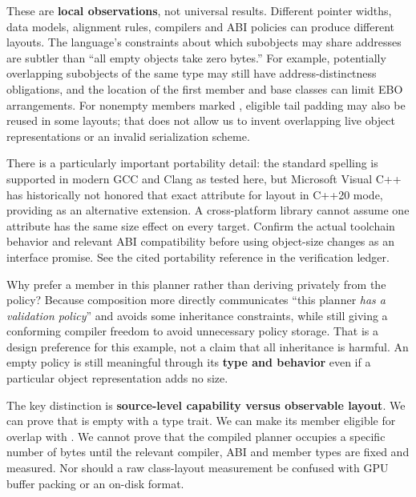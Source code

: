 These are \textbf{local observations}, not universal results. Different pointer widths, data models, alignment rules, compilers and ABI policies can produce different layouts. The language's constraints about which subobjects may share addresses are subtler than ``all empty objects take zero bytes.'' For example, potentially overlapping subobjects of the same type may still have address-distinctness obligations, and the location of the first member and base classes can limit EBO arrangements. For nonempty members marked , eligible tail padding may also be reused in some layouts; that does not allow us to invent overlapping live object representations or an invalid serialization scheme.

There is a particularly important portability detail: the standard spelling  is supported in modern GCC and Clang as tested here, but Microsoft Visual C++ has historically not honored that exact attribute for layout in C++20 mode, providing  as an alternative extension. A cross-platform library cannot assume one attribute has the same size effect on every target. Confirm the actual toolchain behavior and relevant ABI compatibility before using object-size changes as an interface promise. See the cited portability reference in the verification ledger.

Why prefer a  member in this planner rather than deriving privately from the policy? Because composition more directly communicates ``this planner \emph{has a validation policy}'' and avoids some inheritance constraints, while still giving a conforming compiler freedom to avoid unnecessary policy storage. That is a design preference for this example, not a claim that all inheritance is harmful. An empty policy is still meaningful through its \textbf{type and behavior} even if a particular object representation adds no size.

The key distinction is \textbf{source-level capability versus observable layout}. We can prove that  is empty with a type trait. We can make its member eligible for overlap with . We cannot prove that the compiled planner occupies a specific number of bytes until the relevant compiler, ABI and member types are fixed and measured. Nor should a raw class-layout measurement be confused with GPU buffer packing or an on-disk format.

